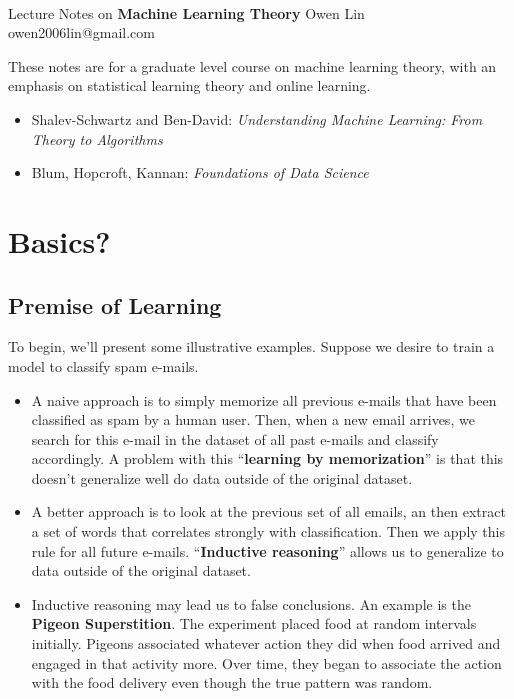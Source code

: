 \documentclass[11pt]{article}
\begin{document}
\thispagestyle{empty}
\bigskip \
\vspace{0.1cm}

\begin{center}
{\fontsize{22}{22} \selectfont Lecture Notes on}
\vskip 16pt
{\fontsize{36}{36} \selectfont \bf \sffamily Machine Learning Theory}
\vskip 24pt
{\fontsize{18}{18} \selectfont \rmfamily Owen Lin} 
\vskip 6pt
{\fontsize{14}{14} \selectfont \ttfamily owen2006lin@gmail.com} 
\vskip 24pt
\end{center}

{\parindent0pt \baselineskip=15.5pt
These notes are for a graduate level course on machine learning theory, with an 
emphasis on statistical learning theory and online learning.
\begin{itemize}
    \item Shalev-Schwartz and Ben-David: \textit{Understanding Machine Learning: From Theory to Algorithms}
    \item Blum, Hopcroft, Kannan: \textit{Foundations of Data Science}
\end{itemize}

}
 


\newpage
\microtoc
\newpage

\section{Basics?}
\subsection{Premise of Learning}
To begin, we'll present some illustrative examples. Suppose we desire to train a model to classify spam e-mails.
\begin{itemize}
    \item A naive approach is to simply memorize all previous e-mails that have been classified as spam by a human user.
    Then, when a new email arrives, we search for this e-mail in the dataset of all past e-mails and classify accordingly. 
    A problem with this ``\textbf{learning by memorization}'' is that this doesn't generalize well do data outside of the original 
    dataset.

    \item A better approach is to look at the previous set of all emails, an then extract a set of words that correlates strongly
    with classification. Then we apply this rule for all future e-mails. ``\textbf{Inductive reasoning}'' allows us to generalize to data
    outside of the original dataset.

    \item Inductive reasoning may lead us to false conclusions. An example is the \textbf{Pigeon Superstition}. The experiment placed food
    at random intervals initially. Pigeons associated whatever action they did when food arrived and engaged in that activity more.
    Over time, they began to associate the action with the food delivery even though the true pattern was random.

\end{itemize}
\end{document}
